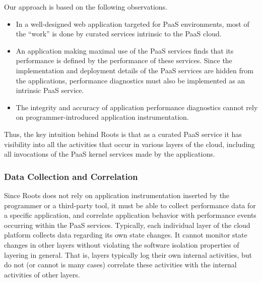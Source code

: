 Our approach is based on the following observations.
\begin{itemize}
\item In a well-designed web application targeted for PaaS environments, 
most of the ``work'' is done by
curated services intrinsic to the PaaS cloud.  
\item An application making maximal use of the PaaS services finds that its
performance is defined by the performance of these services.  Since the 
implementation and deployment details of the PaaS services are hidden
from the applications,
performance diagnostics must also be implemented as an intrinsic PaaS service.
\item The integrity and accuracy of application performance diagnostics
cannot rely on programmer-introduced application instrumentation.
\end{itemize}
Thus, the key intuition behind Roots is that as a curated PaaS service
it has visibility into all the activities that occur in various layers of the cloud,
including all invocations of the PaaS kernel services made by the applications.

%

\subsubsection{Data Collection and Correlation}

Since Roots does not rely on application instrumentation inserted by the
programmer or a third-party tool, it must be able to collect performance data
for a specific application, and correlate application behavior with performance
events occurring within the PaaS services.
Typically, each individual layer of the cloud platform collects data regarding
its own
state changes. It cannot monitor state changes
in other layers without violating the software isolation properties of
layering in general.   That is, layers typically log their own internal
activities, but do not (or cannot is many cases) correlate these activities
with the internal activities of other layers.
 
